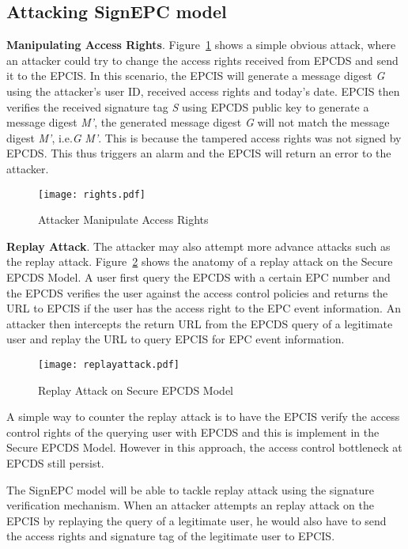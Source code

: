 \documentclass[conference]{IEEEtran}
\begin{document}
\subsection {Attacking SignEPC model}
\textbf{Manipulating Access Rights}. Figure~\ref{fig:rights} shows a simple obvious attack, where an attacker could try to change the access rights received from EPCDS and send it to the EPCIS. In this scenario, the EPCIS will generate a message digest \emph{G} using the attacker's user ID, received access rights and today's date. EPCIS then verifies the received signature tag \emph{S} using EPCDS public key to generate a message digest \emph{M'}, the generated message digest \emph{G} will not match the message digest \emph{M'}, i.e.\emph{G}  \emph{M'}. This is because the tampered access rights was not signed by EPCDS. This thus triggers an alarm and the EPCIS will return an error to the attacker. 

\begin{figure}[h]
\begin{center}
\texttt{[image: rights.pdf]}
\caption{Attacker Manipulate Access Rights \label{fig:rights}}
\end{center}
\end{figure}

\textbf{Replay Attack}. The attacker may also attempt more advance attacks such as the replay attack. Figure~\ref{fig:replay} shows the anatomy of a replay attack on the Secure EPCDS Model. A user first query the EPCDS with a certain EPC number and the EPCDS verifies the user against the access control policies and returns the URL to EPCIS if the user has the access right to the EPC event information. An attacker then intercepts the return URL from the EPCDS query of a legitimate user and replay the URL to query EPCIS for EPC event information.  

\begin{figure}[h]
\begin{center}
\texttt{[image: replayattack.pdf]}
\caption{Replay Attack on Secure EPCDS Model\label{fig:replay}}
\end{center}
\end{figure}

A simple way to counter the replay attack is to have the EPCIS verify the access control rights of the querying user with EPCDS and this is implement in the Secure EPCDS Model. However in this approach, the access control bottleneck at EPCDS still persist.

The SignEPC model will be able to tackle replay attack using the signature verification mechanism. When an attacker attempts an replay attack on the EPCIS by replaying the query of a legitimate user, he would also have to send the access rights and signature tag of the legitimate user to EPCIS. 
\end{document}
